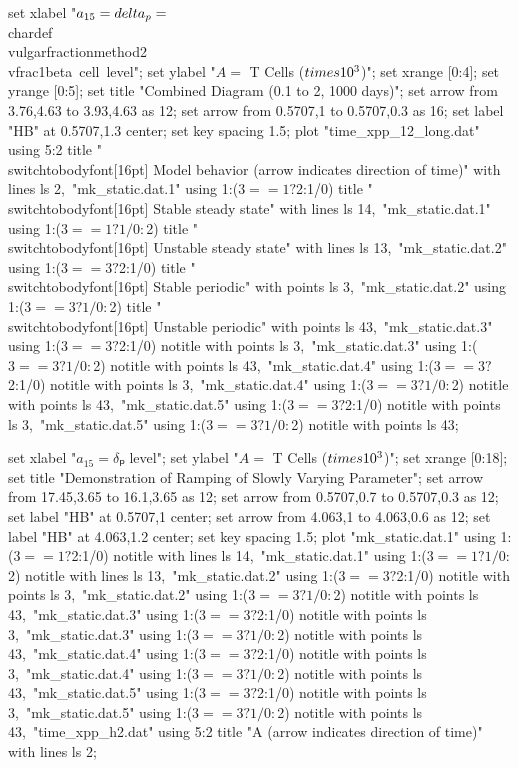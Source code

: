   set xlabel "$a_{15} = \\delta_p = $\\chardef\\vulgarfractionmethod2\\vfrac1{beta~cell~level}";
  set ylabel "$A = $ T Cells ($\\times 10^3$)";
  set xrange [0:4];
  set yrange [0:5];
  set title "Combined Diagram (0.1 to 2, 1000 days)";
  set arrow from 3.76,4.63 to 3.93,4.63 as 12;
  set arrow from 0.5707,1 to 0.5707,0.3 as 16;
  set label "HB" at 0.5707,1.3 center;
  set key spacing 1.5;
  plot "time_xpp_12_long.dat" using 5:2 title "\\switchtobodyfont[16pt] Model behavior (arrow indicates direction of time)" with lines ls 2,\
       "mk_static.dat.1" using 1:($3==1?$2:1/0) title "\\switchtobodyfont[16pt] Stable steady state" with lines ls 14,\
       "mk_static.dat.1" using 1:($3==1?1/0:$2) title "\\switchtobodyfont[16pt] Unstable steady state" with lines ls 13,\
       "mk_static.dat.2" using 1:($3==3?$2:1/0) title "\\switchtobodyfont[16pt] Stable periodic" with points ls 3,\
       "mk_static.dat.2" using 1:($3==3?1/0:$2) title "\\switchtobodyfont[16pt] Unstable periodic" with points ls 43,\
       "mk_static.dat.3" using 1:($3==3?$2:1/0) notitle with points ls 3,\
       "mk_static.dat.3" using 1:($3==3?1/0:$2) notitle with points ls 43,\
       "mk_static.dat.4" using 1:($3==3?$2:1/0) notitle with points ls 3,\
       "mk_static.dat.4" using 1:($3==3?1/0:$2) notitle with points ls 43,\
       "mk_static.dat.5" using 1:($3==3?$2:1/0) notitle with points ls 3,\
       "mk_static.dat.5" using 1:($3==3?1/0:$2) notitle with points ls 43;
\stopGNUPLOTscript

\startGNUPLOTscript[bifurcation_combined_h2]
  set xlabel "$a_{15} = δₚ$ level";
  set ylabel "$A = $ T Cells ($\\times 10^3$)";
  set xrange [0:18];
  set title "Demonstration of Ramping of Slowly Varying Parameter";
  set arrow from 17.45,3.65 to 16.1,3.65 as 12;
  set arrow from 0.5707,0.7 to 0.5707,0.3 as 12;
  set label "HB" at 0.5707,1 center;
  set arrow from 4.063,1 to 4.063,0.6 as 12;
  set label "HB" at 4.063,1.2 center;
  set key spacing 1.5;
  plot "mk_static.dat.1" using 1:($3==1?$2:1/0) notitle with lines ls 14,\
       "mk_static.dat.1" using 1:($3==1?1/0:$2) notitle with lines ls 13,\
       "mk_static.dat.2" using 1:($3==3?$2:1/0) notitle with points ls 3,\
       "mk_static.dat.2" using 1:($3==3?1/0:$2) notitle with points ls 43,\
       "mk_static.dat.3" using 1:($3==3?$2:1/0) notitle with points ls 3,\
       "mk_static.dat.3" using 1:($3==3?1/0:$2) notitle with points ls 43,\
       "mk_static.dat.4" using 1:($3==3?$2:1/0) notitle with points ls 3,\
       "mk_static.dat.4" using 1:($3==3?1/0:$2) notitle with points ls 43,\
       "mk_static.dat.5" using 1:($3==3?$2:1/0) notitle with points ls 3,\
       "mk_static.dat.5" using 1:($3==3?1/0:$2) notitle with points ls 43,\
       "time_xpp_h2.dat" using 5:2 title "A (arrow indicates direction of time)" with lines ls 2;
\stopGNUPLOTscript

